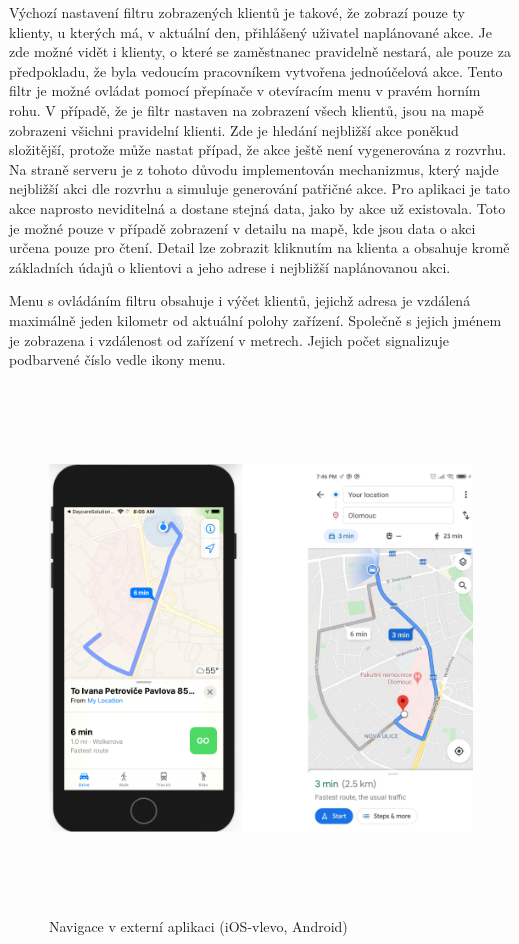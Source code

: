 \documentclass[
  biblatex,
  glossaries,
  index
]{kidiplom}
\begin{document}
Výchozí nastavení filtru zobrazených klientů je takové, že zobrazí pouze ty klienty, u kterých má, v aktuální den, přihlášený uživatel naplánované akce. Je zde možné vidět i klienty, o které se zaměstnanec pravidelně nestará, ale pouze za předpokladu, že byla vedoucím pracovníkem vytvořena jednoúčelová akce. Tento filtr je možné ovládat pomocí přepínače v otevíracím menu v pravém horním rohu. V případě, že je filtr nastaven na zobrazení všech klientů, jsou na mapě zobrazeni všichni pravidelní klienti. Zde je hledání nejbližší akce poněkud složitější, protože může nastat případ, že akce ještě není vygenerována z rozvrhu. Na straně serveru je z tohoto důvodu implementován mechanizmus, který najde nejbližší akci dle rozvrhu a simuluje generování patřičné akce. Pro aplikaci je tato akce naprosto neviditelná a dostane stejná data, jako by akce už existovala. Toto je možné pouze v případě zobrazení v detailu na mapě, kde jsou data o akci určena pouze pro čtení. Detail lze zobrazit kliknutím na klienta a obsahuje kromě základních údajů o klientovi a jeho adrese i nejbližší naplánovanou akci. 

Menu s ovládáním filtru obsahuje i výčet klientů, jejichž adresa je vzdálená maximálně jeden kilometr od aktuální polohy zařízení. Společně s jejich jménem je zobrazena i vzdálenost od zařízení v metrech. Jejich počet signalizuje podbarvené číslo vedle ikony menu.

\begin{figure}[H]
  	\centering
 	 \includegraphics[width=14cm,height=14cm,keepaspectratio]{external_navig}
 	 \caption{Navigace v externí aplikaci (iOS-vlevo, Android)}
 	 \label{fig:externalNavig}
\end{figure}
\end{document}
